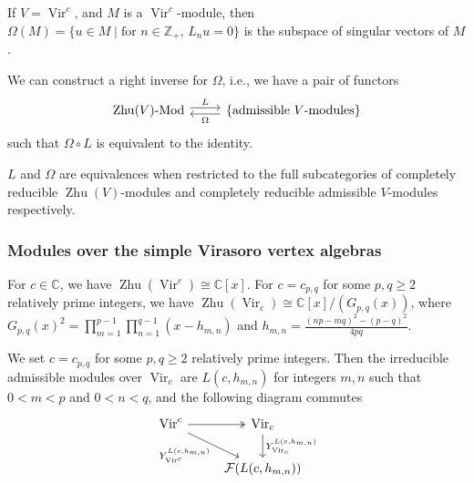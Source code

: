 \documentclass{beamer}
\DeclareMathOperator{\Vir}{Vir}
\DeclareMathOperator{\Zhu}{Zhu}
\begin{document}
\begin{frame}[fragile]

  \begin{example}
    \label{exa:5}
    If $V = \Vir^c$, and $M$ is a $\Vir^c$-module, then $\Omega(M) = \{u \in M \mid \text{for $n \in \mathbb{Z}_+$, $L_nu = 0$}\}$ is the subspace of singular vectors of $M$.
  \end{example}

  We can construct a right inverse for $\Omega$, i.e., we have a pair of functors
  \begin{equation*}
    \begin{tikzcd}
      \text{$\Zhu(V)$-Mod} \arrow[r, "L", shift left] & \{\text{admissible $V$-modules}\} \arrow[l, "\Omega", shift left]
    \end{tikzcd}
  \end{equation*}
  such that $\Omega\circ L$ is equivalent to the identity.

  \begin{theorem}
    \label{thr:7}
    $L$ and $\Omega$ are equivalences when restricted to the full subcategories of completely reducible $\Zhu(V)$-modules and completely reducible admissible $V$-modules respectively.
  \end{theorem}

\end{frame}

\begin{frame}[fragile]
  \frametitle{Modules over the simple Virasoro vertex algebras}

  \begin{example}
    \label{exa:6}
    For $c \in \mathbb{C}$, we have $\Zhu(\Vir^c) \cong \mathbb{C}[x]$.
    For $c = c_{p, q}$ for some $p, q \ge 2$ relatively prime integers, we have $\Zhu(\Vir_c) \cong \mathbb{C}[x]/(G_{p, q}(x))$, where $G_{p ,q}(x)^2 = \prod_{m = 1}^{p - 1}\prod_{n = 1}^{q - 1}(x - h_{m, n})$ and $h_{m, n} = \frac{(np - mq)^2 - (p - q)^2}{4pq}$.
  \end{example}

  \begin{theorem}
    \label{thr:8}
    We set $c = c_{p, q}$ for some $p, q \ge 2$ relatively prime integers.
    Then the irreducible admissible modules over $\Vir_c$ are $L(c, h_{m, n})$ for integers $m, n$ such that $0 < m < p$ and $0 < n < q$, and the following diagram commutes
    \begin{equation*}
      \begin{tikzcd}
        \Vir^c \arrow[r, two heads] \arrow[rd, "{Y^{L(c, h_{m, n})}_{\Vir^c}}"'] & {\Vir_c} \arrow[d, "{Y^{L(c, h_{m, n})}_{\Vir_c}}"] \\
        & {\mathcal{F}(L(c, h_{m, n}))}
      \end{tikzcd}
    \end{equation*}
  \end{theorem}

\end{frame}
\end{document}
